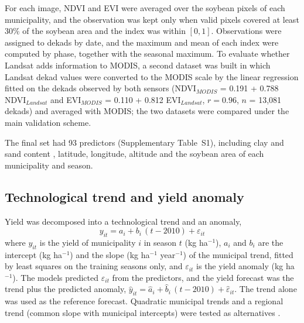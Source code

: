 \documentclass[pdflatex,sn-basic]{sn-jnl}
\begin{document}
For each image, NDVI and EVI were averaged over the soybean pixels of each municipality, and the observation was kept only when valid pixels covered at least 30\% of the soybean area and the index was within $[0, 1]$. Observations were assigned to dekads by date, and the maximum and mean of each index were computed by phase, together with the seasonal maximum. To evaluate whether Landsat adds information to MODIS, a second dataset was built in which Landsat dekad values were converted to the MODIS scale by the linear regression fitted on the dekads observed by both sensors (NDVI$_{MODIS}$ = 0.191 + 0.788 NDVI$_{Landsat}$ and EVI$_{MODIS}$ = 0.110 + 0.812 EVI$_{Landsat}$, $r = 0.96$, $n$ = 13{,}081 dekads) and averaged with MODIS; the two datasets were compared under the main validation scheme.

The final set had 93 predictors (Supplementary Table~S1), including clay and sand content \citep{tluszcz2025}, latitude, longitude, altitude and the soybean area of each municipality and season.

\subsection{Technological trend and yield anomaly}\label{sec:trend}
Yield was decomposed into a technological trend and an anomaly,
\begin{equation}
y_{it} = a_i + b_i\,(t - 2010) + \varepsilon_{it} \label{eq:trend}
\end{equation}
where $y_{it}$ is the yield of municipality $i$ in season $t$ (kg ha$^{-1}$), $a_i$ and $b_i$ are the intercept (kg ha$^{-1}$) and the slope (kg ha$^{-1}$ year$^{-1}$) of the municipal trend, fitted by least squares on the training seasons only, and $\varepsilon_{it}$ is the yield anomaly (kg ha$^{-1}$). The models predicted $\varepsilon_{it}$ from the predictors, and the yield forecast was the trend plus the predicted anomaly, $\hat{y}_{it} = \hat{a}_i + \hat{b}_i\,(t-2010) + \hat{\varepsilon}_{it}$. The trend alone was used as the reference forecast. Quadratic municipal trends and a regional trend (common slope with municipal intercepts) were tested as alternatives \citep{lobell2010,Schwalbert2020}.
\end{document}
